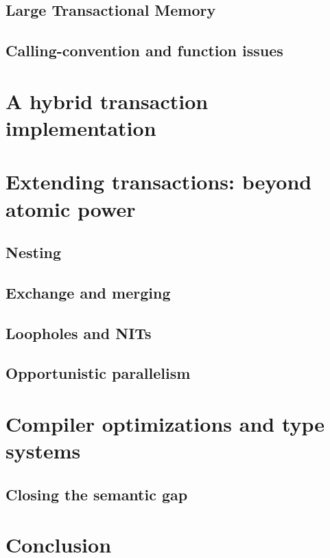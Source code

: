 \documentclass{phd-thesis}
\begin{document}
\section{Large Transactional Memory}
\section{Calling-convention and function issues}


\chapter{A hybrid transaction implementation}\label{sec:hybrid}


\chapter[Extending transactions]{Extending transactions: beyond atomic power}

\section{Nesting}
\section{Exchange and merging}
\section{Loopholes and NITs}
\section{Opportunistic parallelism}

\chapter[Optimizations and type systems]{Compiler optimizations and type systems}
\section{Closing the semantic gap}\label{sec:safe-transactify}

\chapter{Conclusion}
\appendix
\end{document}
